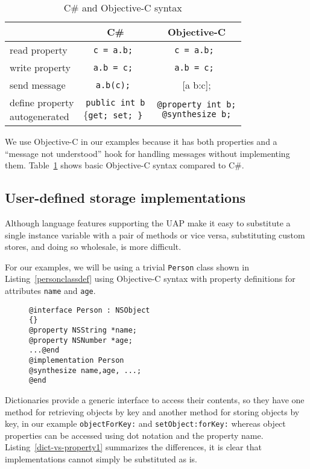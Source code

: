 \documentclass[preprint]{sigplanconf}
\begin{document}
\begin{table}
\center
\begin{tabular}{|l|c|c|} \hline
   & C\#  	 & Objective-C  		 \\\hline 
read property & {\tt c = a.b; }	 & {\tt c = a.b;  }		 \\\hline 
write property & {\tt a.b = c; }	 & {\tt a.b = c; }		 \\\hline 
send message & {\tt a.b(c);  }	 & { [a b:c]; }		 \\\hline 
\shortstack{{define property}\\{autogenerated}}  & \shortstack{ {\tt public int b} \\ { \{\tt get; set; \} }}  & \shortstack{{\tt @property int b;}\\{\tt @synthesize b;}}\\\hline 
\end{tabular}
\caption{C\# and Objective-C syntax}
\label{objc-syntax}
\end{table}

We use Objective-C in our examples because it has both properties and a ``message not understood''
hook for handling messages without implementing them.  Table~\ref{objc-syntax} shows basic
Objective-C syntax compared to C\#.  


\subsection{User-defined storage implementations}
\label{userdefined}
Although language features supporting the UAP make it easy to substitute a single 
instance variable with a pair of methods or vice versa, substituting custom stores,
and doing so wholesale, is more difficult.

For our examples, we will be using a trivial {\tt Person} class shown in Listing~\ref{personclassdef}
using Objective-C syntax with property definitions for attributes {\tt name} and {\tt age}.

\begin{figure}[htbp]
\begin{lstlisting}[style=numbers,label=personclassdef,caption=Person class.]
@interface Person : NSObject 
{}
@property NSString *name;
@property NSNumber *age;
...@end
@implementation Person
@synthesize name,age, ...;
@end
\end{lstlisting}
\end{figure}


Dictionaries provide a generic interface to access their contents, so they have
one method for retrieving objects by key and another method for storing objects
by key, in our example {\tt objectForKey:} and {\tt setObject:forKey:} whereas
object properties can be accessed using dot notation and the property name.
Listing~\ref{dict-vs-property1} summarizes the differences, it is clear that implementations
cannot simply be substituted as is.
\end{document}

